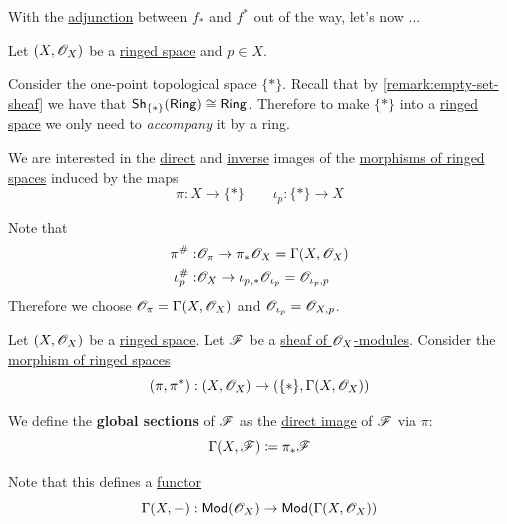 \documentclass[../../../main]{subfiles}
\begin{document}
With the \hyperref[def:adjoint-functors]{adjunction} between \(f_{\ast}\) and \(f^{\ast}\) out of the way, let's now ...

Let \((X, \mathscr{O}_{X})\) be a \hyperref[def:ringed-space]{ringed space} and \(p \in X\).

Consider the one-point topological space \(\{\ast\}\).
Recall that by \autoref{remark:empty-set-sheaf} we have that \(\mathsf{Sh}_{\{\ast\}}(\mathsf{Ring}) \cong \mathsf{Ring}\).
Therefore to make \(\{\ast\}\) into a \hyperref[def:ringed-space]{ringed space} we only need to \textit{accompany} it by a ring.

We are interested in the \hyperref[def:direct-image-ox-mod]{direct} and \hyperref[def:inverse-image-ox-mod]{inverse} images of the \hyperref[def:ringed-space]{morphisms of ringed spaces} induced by the maps
\begin{equation*}
  \pi: X \to \{\ast\} \qquad \iota_{p}: \{\ast\} \to X
\end{equation*}


Note that
\begin{align*}
  \pi^{\#}:& \mathscr{O}_{\pi} \to \pi_{\ast}\mathscr{O}_{X} = \Gamma(X, \mathscr{O}_{X}) \\
  \iota_{p}^{\#}:& \mathscr{O}_{X} \to \iota_{p, \ast}\mathscr{O}_{\iota_{p}} = \mathscr{O}_{\iota_{p}, p}
\end{align*}
Therefore we choose \(\mathscr{O}_{\pi} = \Gamma(X, \mathscr{O}_{X})\) and \(\mathscr{O}_{\iota_{p}} = \mathscr{O}_{X, p}\).

\begin{definition} \label{def:global-sections-ox-mod}
  Let \((X, \mathscr{O}_{X})\) be a \hyperref[def:ringed-space]{ringed space}.
  Let \(\mathscr{F}\) be a \hyperref[def:sheaf-of-modules]{sheaf of \(\mathscr{O}_{X}\)-modules}.
  Consider the \hyperref[def:ringed-space]{morphism of ringed spaces}
  \begin{equation*}
    (\pi, \pi^{\ast}): (X, \mathscr{O}_{X}) \to (\{\ast\}, \Gamma(X, \mathscr{O}_{X}))
  \end{equation*}

  
  We define the \textbf{global sections} of \(\mathscr{F}\) as the \hyperref[def:direct-image-ox-mod]{direct image} of \(\mathscr{F}\) via \(\pi\):
  \begin{equation*}
    \Gamma(X, \mathscr{F}) \coloneq \pi_{\ast}\mathscr{F}
  \end{equation*}

  Note that this defines a \hyperref[def:functor]{functor}
  \begin{equation*}
    \Gamma(X, -): \mathsf{Mod}(\mathscr{O}_{X}) \to \mathsf{Mod}(\Gamma(X, \mathscr{O}_{X}))
  \end{equation*}
\end{definition}
\end{document}
